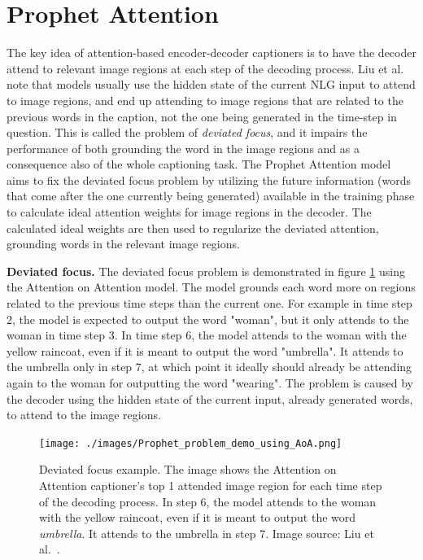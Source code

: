 \documentclass[english,twoside,openright]{HYgraduMLDS}
\begin{document}
\section{Prophet Attention}
The key idea of attention-based encoder-decoder captioners is to have the decoder attend to relevant image regions at each step of the decoding process. Liu et al.~\cite{Prophet} note that models usually use the hidden state of the current NLG input to attend to image regions, and end up attending to image regions that are related to the previous words in the caption, not the one being generated in the time-step in question. This is called the problem of \textit{deviated focus}, and it impairs the performance of both grounding the word in the image regions and as a consequence also of the whole captioning task. The Prophet Attention model aims to fix the deviated focus problem by utilizing the future information (words that come after the one currently being generated) available in the training phase to calculate ideal attention weights for image regions in the decoder. The calculated ideal weights are then used to regularize the deviated attention, grounding words in the relevant image regions.

\textbf{Deviated focus.} The deviated focus problem is demonstrated in figure \ref{fig:Prophet_problem_demo_using_AoA} using the Attention on Attention model. The model grounds each word more on regions related to the previous time steps than the current one. For example in time step 2, the model is expected to output the word "woman", but it only attends to the woman in time step 3. In time step 6, the model attends to the woman with the yellow raincoat, even if it is meant to output the word "umbrella". It attends to the umbrella only in step 7, at which point it ideally should already be attending again to the woman for outputting the word "wearing". The problem is caused by the decoder using the hidden state of the current input, already generated words, to attend to the image regions.
 
\begin{figure}[h] 
\centering
\texttt{[image: ./images/Prophet\_problem\_demo\_using\_AoA.png]}
\caption{Deviated focus example. The image shows the Attention on Attention captioner's top 1 attended image region for each time step of the decoding process. In step 6, the model attends to the woman with the yellow raincoat, even if it is meant to output the word \textit{umbrella}. It attends to the umbrella in step 7. Image source: Liu et al.~\cite{Prophet}.}
\label{fig:Prophet_problem_demo_using_AoA} 
\end{figure}
\end{document}
